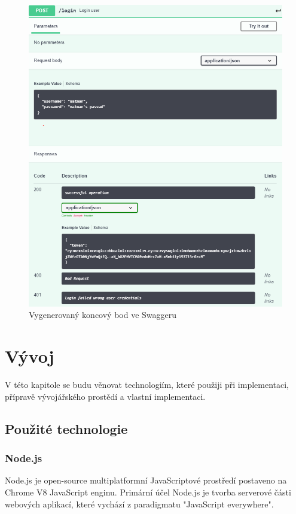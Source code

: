 \documentclass[thesis=B,czech]{FITthesis}[2012/06/26]
\begin{document}
        \begin{figure}[h!] \label{SwaggerGenerated}
            \includegraphics[width=\linewidth]{Swagger_generated_example}
            \caption{Vygenerovaný koncový bod ve Swaggeru}
        \end{figure}        

\chapter{Vývoj}
    V této kapitole se budu věnovat technologiím, které použiji při implementaci, přípravě vývojářského prostědí a vlastní implementaci.
    \section{Použité technologie}
        \subsection{Node.js}
            Node.js je open-source multiplatformní JavaScriptové prostředí postaveno na Chrome V8 JavaScript enginu. Primární účel Node.js je tvorba serverové části webových aplikací, které vychází z paradigmatu "JavaScript everywhere".
            
\end{document}
